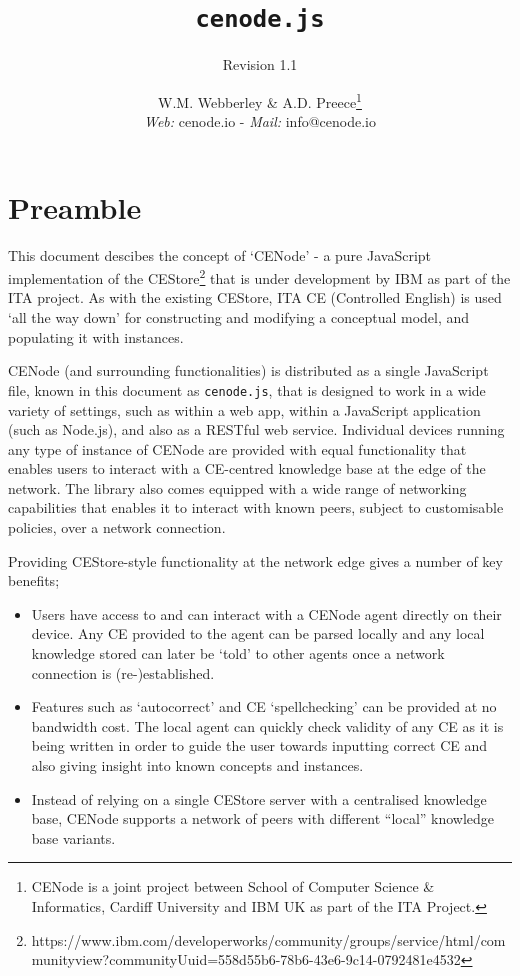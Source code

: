 \documentclass{scrartcl}
\title{\texttt{cenode.js}}
\subtitle{Revision 1.1}
\author{W.M. Webberley \& A.D. Preece\footnote{CENode is a joint project between School of Computer Science \& Informatics, Cardiff University and IBM UK as part of the ITA Project.}\\ \textit{Web:} cenode.io - \textit{Mail:} info@cenode.io}
\date{}
\begin{document}
\maketitle

\section*{Preamble}
This document descibes the concept of `CENode' - a pure JavaScript implementation of the CEStore\footnote{https://www.ibm.com/developerworks/community/groups/service/html/communityview?communityUuid=558d55b6-78b6-43e6-9c14-0792481e4532} that is under development by IBM as part of the ITA project. As with the existing CEStore, ITA CE (Controlled English) is used `all the way down' for constructing and modifying a conceptual model, and populating it with instances. 

CENode (and surrounding functionalities) is distributed as a single JavaScript file, known in this document as \texttt{cenode.js}, that is designed to work in a wide variety of settings, such as within a web app, within a JavaScript application (such as Node.js), and also as a RESTful web service. Individual devices running any type of instance of CENode are provided with equal functionality that enables users to interact with a CE-centred knowledge base at the edge of the network. The library also comes equipped with a wide range of networking capabilities that enables it to interact with known peers, subject to customisable policies, over a network connection.

Providing CEStore-style functionality at the network edge gives a number of key benefits;
\begin{itemize}
    \item Users have access to and can interact with a CENode agent directly on their device. Any CE provided to the agent can be parsed locally and any local knowledge stored can later be `told' to other agents once a network connection is (re-)established.
    \item Features such as `autocorrect' and CE `spellchecking' can be provided at no bandwidth cost. The local agent can quickly check validity of any CE as it is being written in order to guide the user towards inputting correct CE and also giving insight into known concepts and instances.
    \item Instead of relying on a single CEStore server with a centralised knowledge base, CENode supports a network of peers with different ``local'' knowledge base variants.
\end{itemize}
\end{document}
